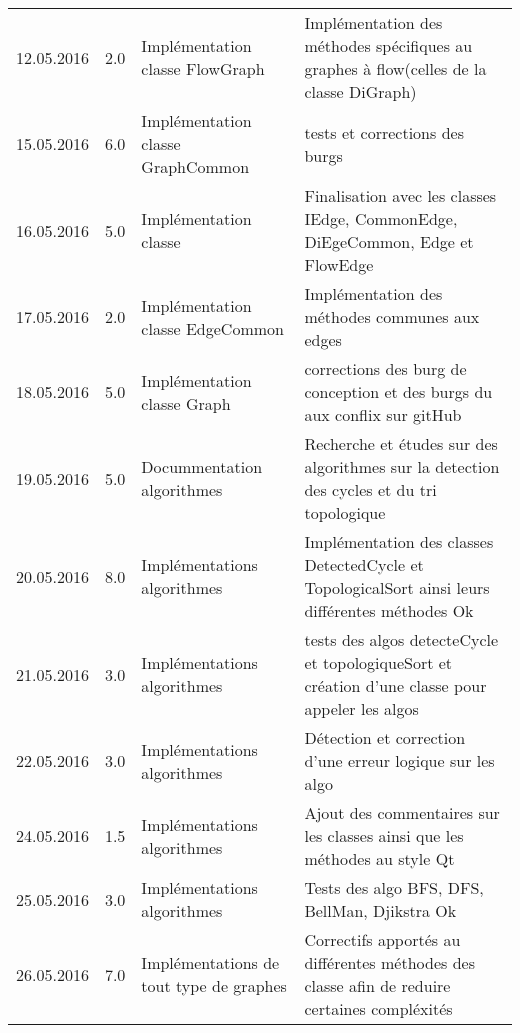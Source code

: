 \documentclass[french]{article}
\begin{document}
\begin{longtable}{p{}|p{}|p{}|p{}}
                12.05.2016 & 2.0 & Implémentation classe FlowGraph &  Implémentation des méthodes spécifiques au graphes à  flow(celles de la classe DiGraph)\\
                15.05.2016 & 6.0 & Implémentation classe GraphCommon & tests et corrections des burgs \\
                \hline
                16.05.2016 & 5.0 & Implémentation classe &  Finalisation avec les classes IEdge, CommonEdge, DiEgeCommon, Edge et FlowEdge \\
		17.05.2016 & 2.0 & Implémentation classe EdgeCommon & Implémentation des méthodes communes aux edges \\
                18.05.2016 & 5.0 & Implémentation classe Graph & corrections des burg de conception et des burgs du aux conflix sur gitHub \\
                19.05.2016 & 5.0 & Docummentation algorithmes  & Recherche et études sur des algorithmes sur la detection des cycles et du tri topologique \\
                20.05.2016 & 8.0 & Implémentations algorithmes & Implémentation des classes DetectedCycle et TopologicalSort ainsi leurs différentes méthodes Ok \\
		21.05.2016 & 3.0 & Implémentations algorithmes & tests des algos detecteCycle et topologiqueSort et création d'une classe pour appeler les algos \\
		\hline
                22.05.2016 & 3.0& Implémentations algorithmes &Détection et correction d'une erreur logique sur les algo \\
                24.05.2016 & 1.5 & Implémentations algorithmes &Ajout des commentaires sur les classes ainsi que les méthodes au style Qt \\
                25.05.2016 & 3.0 & Implémentations algorithmes &Tests des algo BFS, DFS, BellMan, Djikstra Ok\\
                26.05.2016 & 7.0 & Implémentations de tout type de graphes &Correctifs apportés au différentes méthodes des classe afin de reduire certaines compléxités\\
		\hline
                \hline 
                \hline
	\end{longtable}
	
\end{document}
